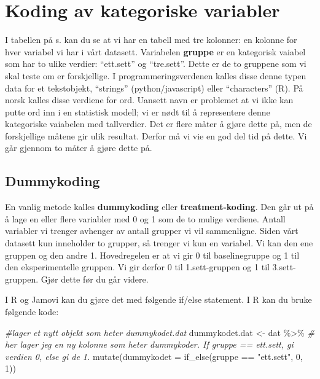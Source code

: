 \documentclass[
]{book}
\newenvironment{Shaded}{\begin{snugshade}}{\end{snugshade}}
\newcommand{\AttributeTok}[1]{\textcolor[rgb]{0.77,0.63,0.00}{#1}}
\newcommand{\CommentTok}[1]{\textcolor[rgb]{0.56,0.35,0.01}{\textit{#1}}}
\newcommand{\DecValTok}[1]{\textcolor[rgb]{0.00,0.00,0.81}{#1}}
\newcommand{\FunctionTok}[1]{\textcolor[rgb]{0.00,0.00,0.00}{#1}}
\newcommand{\NormalTok}[1]{#1}
\newcommand{\OtherTok}[1]{\textcolor[rgb]{0.56,0.35,0.01}{#1}}
\newcommand{\SpecialCharTok}[1]{\textcolor[rgb]{0.00,0.00,0.00}{#1}}
\newcommand{\StringTok}[1]{\textcolor[rgb]{0.31,0.60,0.02}{#1}}
\begin{document}
\hypertarget{koding-av-kategoriske-variabler-1}{%
\chapter{Koding av kategoriske variabler}\label{koding-av-kategoriske-variabler-1}}

I tabellen på s. kan du se at vi har en tabell med tre kolonner: en kolonne for hver variabel vi har i vårt datasett. Variabelen \textbf{gruppe} er en kategorisk vaiabel som har to ulike verdier: ``ett.sett'' og ``tre.sett''. Dette er de to gruppene som vi skal teste om er forskjellige. I programmeringsverdenen kalles disse denne typen data for et tekstobjekt, ``strings'' (python/javascript) eller ``characters'' (R). På norsk kalles disse verdiene for ord. Uansett navn er problemet at vi ikke kan putte ord inn i en statistisk modell; vi er nødt til å representere denne kategoriske vaiabelen med tallverdier. Det er flere måter å gjøre dette på, men de forskjellige måtene gir ulik resultat. Derfor må vi vie en god del tid på dette. Vi går gjennom to måter å gjøre dette på.

\hypertarget{dummykoding-1}{%
\section{Dummykoding}\label{dummykoding-1}}

En vanlig metode kalles \textbf{dummykoding} eller \textbf{treatment-koding}. Den går ut på å lage en eller flere variabler med 0 og 1 som de to mulige verdiene. Antall variabler vi trenger avhenger av antall grupper vi vil sammenligne. Siden vårt datasett kun inneholder to grupper, så trenger vi kun en variabel. Vi kan den ene gruppen og den andre 1. Hovedregelen er at vi gir 0 til baselinegruppe og 1 til den eksperimentelle gruppen. Vi gir derfor 0 til 1.sett-gruppen og 1 til 3.sett-gruppen. Gjør dette før du går videre.

I R og Jamovi kan du gjøre det med følgende if/else statement. I R kan du bruke følgende kode:

\begin{Shaded}
\begin{Highlighting}[]
\CommentTok{\#lager et nytt objekt som heter dummykodet.dat}
\NormalTok{dummykodet.dat }\OtherTok{\textless{}{-}}\NormalTok{ dat }\SpecialCharTok{\%\textgreater{}\%}
  \CommentTok{\# her lager jeg en ny kolonne som heter dummykoder. If gruppe == \textquotesingle{}ett.sett\textquotesingle{}, gi verdien 0, else gi de 1.}
  \FunctionTok{mutate}\NormalTok{(}\AttributeTok{dummykodet =} \FunctionTok{if\_else}\NormalTok{(gruppe }\SpecialCharTok{==} \StringTok{"ett.sett"}\NormalTok{, }\DecValTok{0}\NormalTok{, }\DecValTok{1}\NormalTok{))}
\end{Highlighting}
\end{Shaded}
\end{document}
